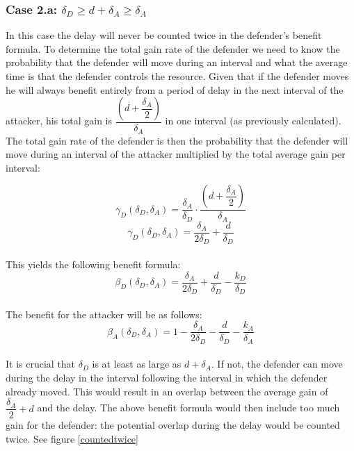 \subsubsection*{\textbf{Case 2.a:} $ \delta_{D} \geq d + \delta_{A} \geq \delta_{A}$}
In this case the delay will never be counted twice in the defender's  benefit formula. To determine the total gain rate of the defender we need to know the probability that the defender will move during an interval and what the average time is that the defender controls the resource. Given that if the defender moves he will always benefit entirely from a period of delay in the next interval of the attacker, his total gain is $\dfrac{(d+\dfrac{\delta_{A}}{2})}{\delta_{A}}$ in one interval (as previously calculated). The total gain  rate of the defender is then the probability that the defender will move during an interval of the attacker multiplied by the total average gain per interval: 

\begin{equation*}\label{first}
\gamma_{D}(\delta_{D},\delta_{A}) = \dfrac{\delta_{A}}{\delta_{D}} \cdot \dfrac{(d+\dfrac{\delta_{A}}{2})}{\delta_{A}} 
\end{equation*}
\begin{equation*}\label{first}
\gamma_{D}(\delta_{D},\delta_{A}) = \dfrac{\delta_{A}}{2\delta_{D}} + \dfrac{d}{\delta_{D}} 
\end{equation*}\\
This yields the following benefit formula:
\begin{equation}\label{benfcase2a:defender}
\beta_{D}(\delta_{D},\delta_{A}) = \dfrac{\delta_{A}}{2\delta_{D}} + \dfrac{d}{\delta_{D}} - \dfrac{k_{D}}{ \delta_{D}}
\end{equation}\\

The benefit for the attacker will be as follows:
\begin{equation}\label{benfcase2a:attacker}
\beta_{A}(\delta_{D},\delta_{A}) = 1 -\dfrac{\delta_{A}}{2\delta_{D}} - \dfrac{d}{\delta_{D}} - \dfrac{k_{A}}{ \delta_{A}}
\end{equation}\\



It is crucial that $ \delta_{D}$ is at least as large as $d + \delta_{A}$. If not, the defender can move during the delay in the interval following the interval in which the defender already moved. This would result in an overlap between the average gain of $\dfrac{\delta_{A}}{2} +d$ and the delay. The above benefit formula would then include too much gain for the defender: the potential overlap during the delay would be counted twice. See figure \ref{countedtwice}\\

